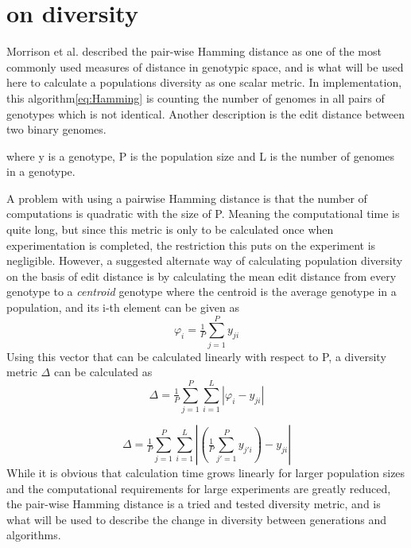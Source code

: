 \chapter{on diversity}
 Morrison et al.\cite{populationDiversity} described the pair-wise Hamming distance as one of the most commonly used measures of distance in genotypic space, and is what will be used here to calculate a populations diversity as one scalar metric. In implementation, this algorithm\ref{eq:Hamming} is counting the number of genomes in all pairs of genotypes which is not identical. Another description is the edit distance between two binary genomes. 


where y is a genotype, P is the population size and L is the number of genomes in a genotype.

A problem with using a pairwise Hamming distance is that the number of computations is quadratic with the size of P. Meaning the computational time is quite long, but since this metric is only to be calculated once when experimentation is completed, the restriction this puts on the experiment is negligible. However, a suggested alternate way of calculating population diversity on the basis of edit distance is by calculating the mean edit distance from every genotype to a \textit{centroid} genotype where the centroid is the average genotype in a population, and its i-th element can be given as  
\begin{equation}
    \label{eq:centroid}
    \varphi_{i}=\tfrac{1}{P}\sum_{j=1}^{P}y_{ji}
\end{equation}
Using this vector that can be calculated linearly with respect to P, a diversity metric \(\Delta\) can be calculated as 
\begin{equation*}
    \Delta = \tfrac{1}{P}\sum_{j=1}^{P}\sum_{i=1}^{L}\left | \varphi_{i}-y_{ji} \right |
\end{equation*}

\begin{equation}
    \label{eq:homemade diversity}
    \Delta = \tfrac{1}{{P}}\sum_{j=1}^{P}\sum_{i=1}^{L}\left | (\tfrac{1}{{P}}\sum_{{j}'=1}^{P}y_{{j}'i})-y_{ji} \right |
\end{equation}
While it is obvious that calculation time grows linearly for larger population sizes and the computational requirements for large experiments are greatly reduced, the pair-wise Hamming distance is a tried and tested diversity metric, and is what will be used to describe the change in diversity between generations and algorithms. 

